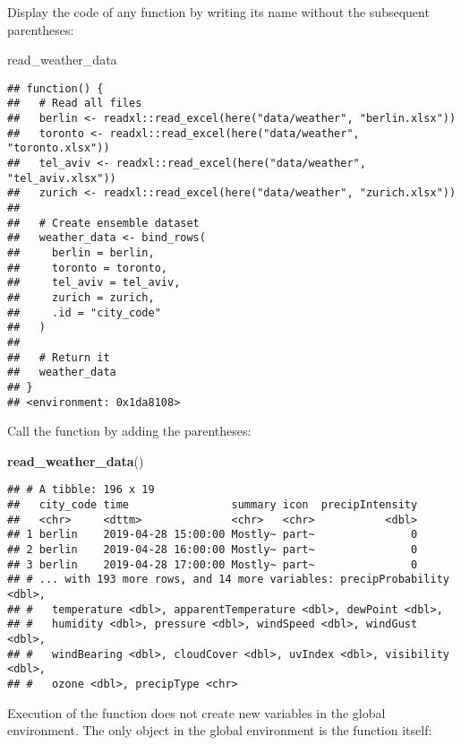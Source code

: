 \documentclass[]{book}
\newenvironment{Shaded}{\begin{snugshade}}{\end{snugshade}}
\newcommand{\KeywordTok}[1]{\textcolor[rgb]{0.13,0.29,0.53}{\textbf{#1}}}
\newcommand{\NormalTok}[1]{#1}
\begin{document}
Display the code of any function by writing its name without the subsequent parentheses:

\begin{Shaded}
\begin{Highlighting}[]
\NormalTok{read_weather_data}
\end{Highlighting}
\end{Shaded}

\begin{verbatim}
## function() {
##   # Read all files
##   berlin <- readxl::read_excel(here("data/weather", "berlin.xlsx"))
##   toronto <- readxl::read_excel(here("data/weather", "toronto.xlsx"))
##   tel_aviv <- readxl::read_excel(here("data/weather", "tel_aviv.xlsx"))
##   zurich <- readxl::read_excel(here("data/weather", "zurich.xlsx"))
## 
##   # Create ensemble dataset
##   weather_data <- bind_rows(
##     berlin = berlin,
##     toronto = toronto,
##     tel_aviv = tel_aviv,
##     zurich = zurich,
##     .id = "city_code"
##   )
## 
##   # Return it
##   weather_data
## }
## <environment: 0x1da8108>
\end{verbatim}

Call the function by adding the parentheses:

\begin{Shaded}
\begin{Highlighting}[]
\KeywordTok{read_weather_data}\NormalTok{()}
\end{Highlighting}
\end{Shaded}

\begin{verbatim}
## # A tibble: 196 x 19
##   city_code time                summary icon  precipIntensity
##   <chr>     <dttm>              <chr>   <chr>           <dbl>
## 1 berlin    2019-04-28 15:00:00 Mostly~ part~               0
## 2 berlin    2019-04-28 16:00:00 Mostly~ part~               0
## 3 berlin    2019-04-28 17:00:00 Mostly~ part~               0
## # ... with 193 more rows, and 14 more variables: precipProbability <dbl>,
## #   temperature <dbl>, apparentTemperature <dbl>, dewPoint <dbl>,
## #   humidity <dbl>, pressure <dbl>, windSpeed <dbl>, windGust <dbl>,
## #   windBearing <dbl>, cloudCover <dbl>, uvIndex <dbl>, visibility <dbl>,
## #   ozone <dbl>, precipType <chr>
\end{verbatim}

Execution of the function does not create new variables in the global environment.
The only object in the global environment is the function itself:
\end{document}
